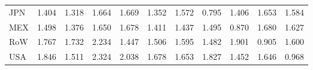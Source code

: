 \begin{table}[htbp]
\begin{tabular}{lcccccccccc}
  JPN & \textcolor[RGB]{189,122,66}{1.404} & \textcolor[RGB]{214,139,41}{1.318} & \textcolor[RGB]{92,59,163}{1.664} & \textcolor[RGB]{89,58,166}{1.669} & \textcolor[RGB]{209,135,46}{1.352} & \textcolor[RGB]{122,79,133}{1.572} & \textcolor[RGB]{250,162,5}{0.795} & \textcolor[RGB]{186,120,69}{1.406} & \textcolor[RGB]{97,63,158}{1.653} & \textcolor[RGB]{117,76,138}{1.584} \\ 
  MEX & \textcolor[RGB]{156,101,99}{1.498} & \textcolor[RGB]{196,127,59}{1.376} & \textcolor[RGB]{99,64,156}{1.650} & \textcolor[RGB]{82,53,173}{1.678} & \textcolor[RGB]{181,117,74}{1.411} & \textcolor[RGB]{173,112,82}{1.437} & \textcolor[RGB]{161,104,94}{1.495} & \textcolor[RGB]{240,155,15}{0.870} & \textcolor[RGB]{77,50,178}{1.680} & \textcolor[RGB]{105,68,150}{1.627} \\ 
  RoW & \textcolor[RGB]{56,36,199}{1.767} & \textcolor[RGB]{61,40,194}{1.732} & \textcolor[RGB]{5,3,250}{2.234} & \textcolor[RGB]{171,111,84}{1.447} & \textcolor[RGB]{150,97,105}{1.506} & \textcolor[RGB]{112,73,143}{1.595} & \textcolor[RGB]{166,107,89}{1.482} & \textcolor[RGB]{20,13,235}{1.901} & \textcolor[RGB]{237,153,18}{0.905} & \textcolor[RGB]{107,69,148}{1.600} \\ 
  USA & \textcolor[RGB]{38,25,217}{1.846} & \textcolor[RGB]{148,96,107}{1.511} & \textcolor[RGB]{3,2,252}{2.324} & \textcolor[RGB]{10,7,245}{2.038} & \textcolor[RGB]{79,51,176}{1.678} & \textcolor[RGB]{94,61,161}{1.653} & \textcolor[RGB]{48,31,207}{1.827} & \textcolor[RGB]{168,109,87}{1.452} & \textcolor[RGB]{102,66,153}{1.646} & \textcolor[RGB]{230,148,26}{0.968} \\ 
   \hline
\end{tabular}
\end{table}
